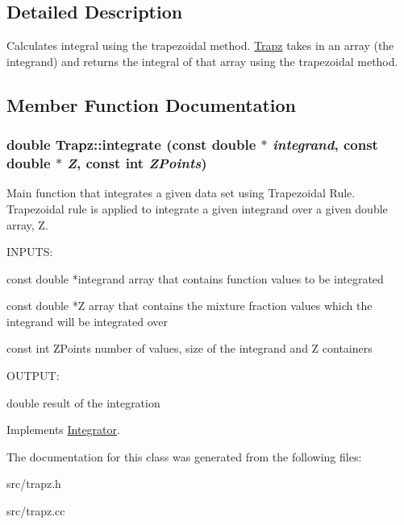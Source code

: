 \subsection{Detailed Description}
Calculates integral using the trapezoidal method. \hyperlink{classTrapz}{Trapz} takes in an array (the integrand) and returns the integral of that array using the trapezoidal method. 

\subsection{Member Function Documentation}
\hypertarget{classTrapz_a8aee327ed631f75ef3dea7e458f71cca}{
\subsubsection[{integrate}]{\setlength{\rightskip}{0pt plus 5cm}double Trapz::integrate (const double $\ast$ {\em integrand}, \/  const double $\ast$ {\em Z}, \/  const int {\em ZPoints})}}
\label{d8/da8/classTrapz_a8aee327ed631f75ef3dea7e458f71cca}


Main function that integrates a given data set using Trapezoidal Rule. Trapezoidal rule is applied to integrate a given integrand over a given double array, Z.

\begin{DoxyVerb}
  INPUTS:

  const double *integrand          array that contains function values to be integrated

  const double *Z                  array that contains the mixture fraction values which the integrand will be integrated over

  const int ZPoints                number of values, size of the integrand and Z containers

  
  OUTPUT:

  double                           result of the integration
 
  \end{DoxyVerb}
 

Implements \hyperlink{classIntegrator_a89fbef2f7923ce4e2c979b2ff1d1f4ac}{Integrator}.

The documentation for this class was generated from the following files:\begin{DoxyCompactItemize}
\item 
src/trapz.h\item 
src/trapz.cc\end{DoxyCompactItemize}
